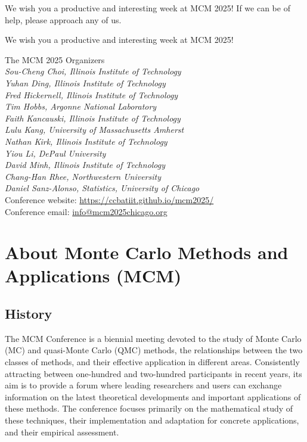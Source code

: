 We wish you a productive and interesting week at MCM 2025! If we can be of help, please approach any of us.

We wish you a productive and interesting week at MCM 2025!


\bigskip

The MCM 2025 Organizers \\
\emph{Sou-Cheng Choi, Illinois Institute of Technology \\
Yuhan Ding, Illinois Institute of Technology \\
Fred Hickernell, Illinois Institute of Technology \\
Tim Hobbs, Argonne National Laboratory \\
Faith Kancauski, Illinois Institute of Technology \\
Lulu Kang, University of Massachusetts Amherst \\
Nathan Kirk, Illinois Institute of Technology \\
Yiou Li, DePaul University \\
David Minh, Illinois Institute of Technology \\
Chang-Han Rhee, Northwestern University \\
Daniel Sanz-Alonso, Statistics, University of Chicago} \\




\vspace{1cm}
Conference website: \url{https://ccbatiit.github.io/mcm2025/} \\
Conference email: \url{info@mcm2025chicago.org}

\thispagestyle{empty} \tableofcontents

\section{About Monte Carlo Methods and Applications (MCM)}

\subsection{History}

The MCM Conference is a biennial meeting devoted to the study of Monte
Carlo (MC) and quasi-Monte Carlo (QMC) methods, the relationships between
the two classes of methods, and their effective application in different
areas. Consistently attracting between one-hundred and two-hundred participants in recent years, its aim
is to provide a forum where leading researchers and users can exchange
information on the latest theoretical developments and important
applications of these methods. The conference focuses primarily
on the mathematical study of these techniques, their implementation and
adaptation for concrete applications, and their empirical assessment.

